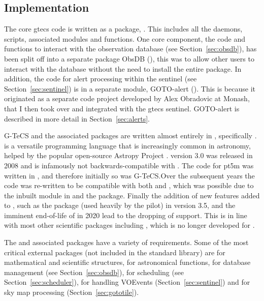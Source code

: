 \begin{colsection}
\begin{colsection}
\end{colsection}


\subsection{Implementation}
\label{sec:implementation}
\begin{colsection}

The core \gls{gtecs} code is written as a  package, . This includes all the daemons, scripts, associated modules and functions. One core component, the code and functions to interact with the observation database (see Section~\ref{sec:obsdb}), has been split off into a separate  package ObsDB (), this was to allow other users to interact with the database without the need to install the entire  package. In addition, the code for alert processing within the sentinel (see Section~\ref{sec:sentinel}) is in a separate module, GOTO-alert (). This is because it originated as a separate code project developed by Alex Obradovic at Monash, that I then took over and integrated with the \gls{gtecs} sentinel. GOTO-alert is described in more detail in Section~\ref{sec:alerts}.

G-TeCS and the associated packages are written almost entirely in , specifically .  is a versatile programming language that is increasingly common in astronomy, helped by the popular open-source Astropy Project \citep{astropy}.  version 3.0 was released in 2008 and is infamously not backwards-compatible with . The code for \gls{pt5m} was written in , and therefore initially so was G-TeCS.\@ Over the subsequent years the code was re-written to be compatible with both  and , which was possible due to the inbuilt  module in  and the  package. Finally the addition of new features added to , such as the  package (used heavily by the pilot) in version 3.5, and the imminent end-of-life of  in 2020 lead to the dropping of  support. This is in line with most other scientific  packages including , which is no longer developed for . %

The  and associated packages have a variety of requirements. Some of the most critical external packages (not included in the  standard library) are  for mathematical and scientific structures,  for astronomical functions,  for  database management (see Section~\ref{sec:obsdb}),  for scheduling (see Section~\ref{sec:scheduler}),  for handling VOEvents (Section~\ref{sec:sentinel}) and  for sky map processing (Section~\ref{sec:gototile}).


\end{colsection}
\end{colsection}

